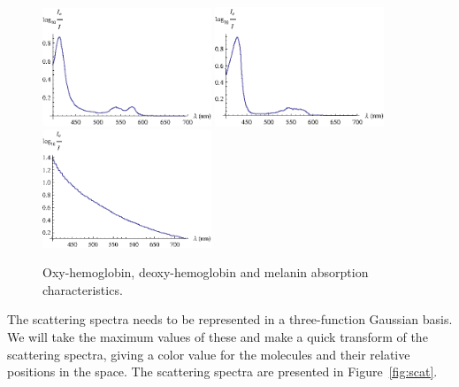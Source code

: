 \begin{figure}[h!]
  \caption{Oxy-hemoglobin, deoxy-hemoglobin and melanin absorption characteristics.}\label{fig:abs}
  \centering
    \includegraphics[width=0.45\textwidth]{Chapter2/Figs/absOxyHemo.eps}
    \includegraphics[width=0.45\textwidth]{Chapter2/Figs/absDeoxyHemo.eps}
    \includegraphics[width=0.45\textwidth]{Chapter2/Figs/absMelanin.eps}
\end{figure}

The scattering spectra needs to be represented in a three-function Gaussian basis. We will take the maximum values of these and make a quick transform of the scattering spectra, giving a color value for the molecules and their relative positions in the space. The scattering spectra are presented in Figure~\ref{fig:scat}.

